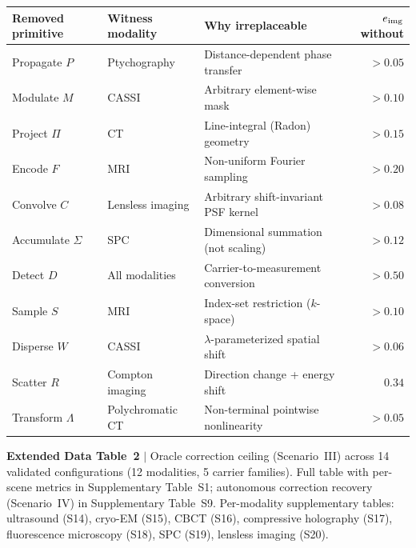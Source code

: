 \begin{center}
\small\setlength{\tabcolsep}{5pt}
\begin{tabular}{@{}lllr@{}}
\toprule
\textbf{Removed primitive} & \textbf{Witness modality} & \textbf{Why irreplaceable} & $e_{\mathrm{img}}$ \textbf{without} \\
\midrule
Propagate $P$     & Ptychography         & Distance-dependent phase transfer    & $> 0.05$ \\
Modulate $M$      & CASSI                & Arbitrary element-wise mask          & $> 0.10$ \\
Project $\Pi$     & CT                   & Line-integral (Radon) geometry       & $> 0.15$ \\
Encode $F$        & MRI                  & Non-uniform Fourier sampling         & $> 0.20$ \\
Convolve $C$      & Lensless imaging     & Arbitrary shift-invariant PSF kernel & $> 0.08$ \\
Accumulate $\Sigma$ & SPC                & Dimensional summation (not scaling)  & $> 0.12$ \\
Detect $D$        & All modalities       & Carrier-to-measurement conversion    & $> 0.50$ \\
Sample $S$        & MRI                  & Index-set restriction ($k$-space)    & $> 0.10$ \\
Disperse $W$      & CASSI                & $\lambda$-parameterized spatial shift & $> 0.06$ \\
Scatter $R$       & Compton imaging      & Direction change + energy shift      & $0.34$  \\
Transform $\Lambda$ & Polychromatic CT   & Non-terminal pointwise nonlinearity  & $> 0.05$ \\
\bottomrule
\end{tabular}
\end{center}
\label{tab:necessity}

\vspace{12pt}

\noindent\textbf{Extended Data Table~2} $|$ Oracle correction ceiling (Scenario~III) across 14 validated configurations (12 modalities, 5 carrier families). Full table with per-scene metrics in Supplementary Table~S1; autonomous correction recovery (Scenario~IV) in Supplementary Table~S9. Per-modality supplementary tables: ultrasound (S14), cryo-EM (S15), CBCT (S16), compressive holography (S17), fluorescence microscopy (S18), SPC (S19), lensless imaging (S20).




